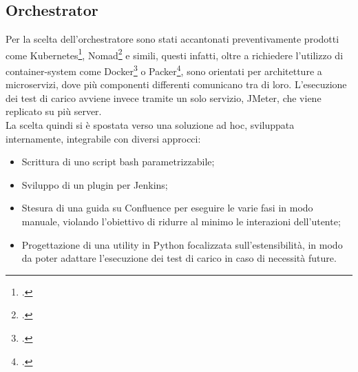 \subsection{Orchestrator}
Per la scelta dell'orchestratore sono stati accantonati preventivamente prodotti come Kubernetes\footcite{site:kubernetes}, Nomad\footcite{site:nomad} e simili, questi infatti, oltre a richiedere l'utilizzo di \gls{container-system} come Docker\footcite{site:docker} o Packer\footcite{site:packer}, sono orientati per architetture a 	\gls{microservizi}, dove più componenti differenti comunicano tra di loro. L'esecuzione dei test di carico avviene invece tramite un solo servizio, JMeter, che viene replicato su più server. \\
La scelta quindi si è spostata verso una soluzione ad hoc, sviluppata internamente, integrabile con diversi approcci:
\begin{itemize}
	\item Scrittura di uno script bash parametrizzabile;
	\item Sviluppo di un \gls{plugin} per Jenkins;
	\item Stesura di una guida su Confluence per eseguire le varie fasi in modo manuale, violando l'obiettivo di ridurre al minimo le interazioni dell'utente;
	\item Progettazione di una utility in Python focalizzata sull'estensibilità, in modo da poter adattare l'esecuzione dei test di carico in caso di necessità future.
\end{itemize}
